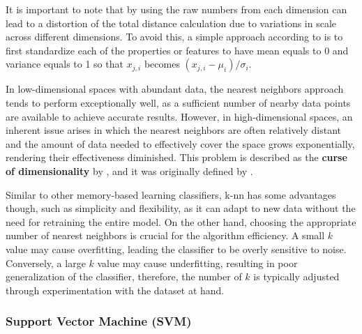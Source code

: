 
It is important to note that by using the raw numbers from each dimension can lead to a distortion of the total distance calculation due to variations in scale across different dimensions. To avoid this, a simple approach according to \textcite{Hastie2009} is to first standardize each of the properties or features to have mean equals to 0 and variance equals to 1 so that $x_{j, i}$ becomes $\left(x_{j, i}-\mu_i\right) / \sigma_i$.

 In low-dimensional spaces with abundant data, the nearest neighbors approach tends to perform exceptionally well, as a sufficient number of nearby data points are available to achieve accurate results. However, in high-dimensional spaces, an inherent issue arises in which the nearest neighbors are often relatively distant and the amount of data needed to effectively cover the space grows exponentially, rendering their effectiveness diminished. This problem is described as the \textbf{curse of dimensionality} by \textcite{Russel2010}, \textcite{Hastie2009} and it was originally defined by \textcite{Bellman1961}.

Similar to other memory-based learning classifiers, \gls{k-nn} has some advantages though, such as simplicity and flexibility, as it can adapt to new data without the need for retraining the entire model. On the other hand, choosing the appropriate number of nearest neighbors is crucial for the algorithm efficiency. A small $k$ value may cause overfitting, leading the classifier to be overly sensitive to noise. Conversely, a large $k$ value may cause underfitting, resulting in poor generalization of the classifier, therefore, the number of $k$ is typically adjusted through experimentation with the dataset at hand.


\subsubsection{Support Vector Machine (SVM)}
\label{subsubsec:machine_learning_svm}

